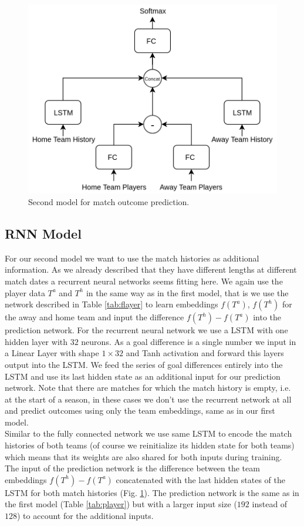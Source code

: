 \documentclass[a4paper]{article}
\begin{document}
\begin{figure} 
\includegraphics[scale=0.28]{img/Siamese2.png}
\caption{Second model for match outcome prediction.}
\label{fig:rnn}
\end{figure}

\subsection{RNN Model}
For our second model we want to use the match histories as additional
information. As we already described that they have different lengths
at different match dates a recurrent neural networks seems fitting here. We again use the player data $T^a$ and $T^h$ in the same
way as in the first model, that is we use the network described in
Table \ref{tab:flayer} to learn embeddings $f(T^a)$, $f(T^h)$ for the away and
home team and input the difference $f(T^h) - f(T^a)$ into the prediction
network. For the recurrent neural network we use a LSTM \cite{LSTM97} with one
hidden layer with $32$ neurons. As a goal difference is a single number we input in a
Linear Layer with shape $1 \times 32$ and Tanh activation and forward this layers output into the LSTM. We
feed the series of goal differences entirely into the LSTM and use its last
hidden state as an additional input for our prediction network. Note that there
are matches for which the match history is empty, i.e. at the start of a season,
in these cases we don't use the recurrent network at all and predict outcomes using only the team embeddings, same as in our first model. \\
Similar to the fully connected network we use same LSTM to encode the match histories of both teams (of course we reinitialize its
hidden state for both teams)
which means that its weights are also shared for both inputs during training. \\
The input of the prediction network is the difference between the team
embeddings $f(T^h) - f(T^a)$ concatenated with the last hidden states of the
LSTM for both match histories (Fig. \ref{fig:rnn}). The prediction network is the same as in the
first model (Table \ref{tab:player}) but with a larger input size ($192$ instead
of $128$) to account for the additional inputs.
\end{document}
